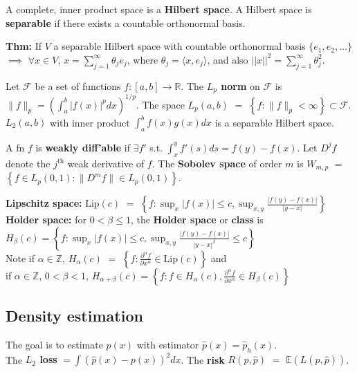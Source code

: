\documentclass[10pt,twocolumn]{article}
\begin{document}
    A complete, inner product space is a \textbf{Hilbert space}. %
    A Hilbert space is \textbf{separable} if there exists a countable orthonormal basis.

    \textbf{Thm:} If $V$ a separable Hilbert space with countable orthonormal basis 
        $\{ e_1,e_2,\ldots \}$ $\implies$ $\forall x \in V$, $x = \sum_{j=1}^{\infty}\theta_je_j$, 
        where $\theta_j = \langle x, e_j \rangle$, and also $||x||^2 = \sum_{j=1}^{\infty}\theta_j^2$.

    Let $\mathcal{F}$ be a set of functions $f:[a,b] \rightarrow \mathbb{R}$.
    The \textbf{$L_p$ norm} on $\mathcal{F}$ is $\| f \|_p = \left( \int_a^b |f(x)|^p dx  \right)^{1/p}$\hspace{-2mm}. 
    The space $L_p(a,b)$ $=$ $\left\{  f : \| f \|_p < \infty \right\} \subset \mathcal{F}$.
    $L_2(a,b)$ with inner product $\int_a^b f(x)g(x) dx$ is a separable Hilbert space.

    A fn $f$ is \textbf{weakly diff'able} if $\exists f'$ s.t. $\int_x^y f'(s) ds = f(y) - f(x)$.
    Let $D^jf$ denote the $j^{\text{th}}$ weak derivative of $f$.
    The \textbf{Sobolev space} of order $m$ is $W_{m,p}$ $=$ $\left\{ f \in L_p(0,1) : \|D^m f\| \in L_p(0,1) \right\}$.

    \textbf{Lipschitz space:} $\text{Lip}(c)$ $=$ $\left\{ f : \sup_x |f(x)| \leq c, \sup_{x,y} \frac{|f(y)-f(x)|}{|y-x|} \right\}$
\textbf{Holder space:} for $0<\beta\leq 1$, the \textbf{Holder space} or \textbf{class} is\\
    $H_{\beta}(c) = \left\{ f : \sup_x |f(x)| \leq c, 
        \sup_{x,y} \frac{|f(y)-f(x)|}{|y-x|^{\beta}} \leq c \right\}$\\
    Note if $\alpha \in \mathbb{Z}$, $H_{\alpha}(c)$ $=$ $\left\{ f : \frac{\partial^{\alpha} f}{\partial x^{\alpha}} \in \text{Lip}(c) \right\}$ and\\
    if $\alpha \in \mathbb{Z}$, $0 < \beta < 1$, $H_{\alpha+\beta}(c) 
        = \left\{ f : f \in H_{\alpha}(c), \frac{\partial^{\alpha} f}{\partial x^{\alpha}} \in H_{\beta}(c) \right\}$

\subsection*{Density estimation}
    The goal is to estimate $p(x)$ with estimator $\hat{p}(x) = \hat{p}_h(x)$. \\
    The \textbf{$L_2$ loss} $= \int \left( \hat{p}(x) - p(x) \right)^2 dx$.
    The \textbf{risk} $R(p,\hat{p})$ $=$ $\mathbb{E}(L(p,\hat{p}))$.
\end{document}
